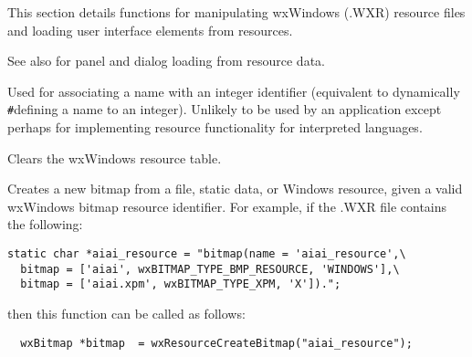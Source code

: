 
This section details functions for manipulating wxWindows (.WXR) resource
files and loading user interface elements from resources.



See also  for panel and dialog
loading from resource data.

\label{wxresourceaddidentifier}


Used for associating a name with an integer identifier (equivalent to dynamically\rtfsp
\verb$#$defining a name to an integer). Unlikely to be used by an application except
perhaps for implementing resource functionality for interpreted languages.



Clears the wxWindows resource table.



Creates a new bitmap from a file, static data, or Windows resource, given a valid
wxWindows bitmap resource identifier. For example, if the .WXR file contains
the following:

\begin{verbatim}
static char *aiai_resource = "bitmap(name = 'aiai_resource',\
  bitmap = ['aiai', wxBITMAP_TYPE_BMP_RESOURCE, 'WINDOWS'],\
  bitmap = ['aiai.xpm', wxBITMAP_TYPE_XPM, 'X']).";
\end{verbatim}

then this function can be called as follows:

\begin{verbatim}
  wxBitmap *bitmap  = wxResourceCreateBitmap("aiai_resource");
\end{verbatim}

